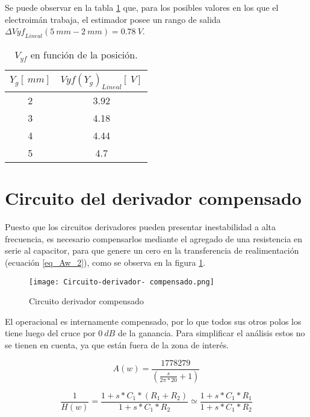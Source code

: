 \noindent Se puede observar en la tabla \ref{tab_Vyf_vs_y} que, para los posibles valores en los que el electroim\'{a}n trabaja, el estimador posee un rango de salida ${\mathit{\Delta}{Vyf}_{Lineal}}(5\:mm-2\:mm)= 0.78\:V$.

\begin{table}[H]
	\begin{center}
		\begin{tabular}{| c | c |}
			\hline
			$Y_g[\:mm]$ & ${Vyf(Y_g)}_{Lineal} [\:V]$\\ \hline
			2 & 3.92 \\ \hline 
			3 & 4.18 \\ \hline 
			4 & 4.44 \\ \hline 
			5 & 4.7 \\ \hline 
		\end{tabular}
		\caption{$V_{yf}$ en función de la posición.}
		\label{tab_Vyf_vs_y}
	\end{center}
\end{table}

\section{Circuito del derivador compensado}

\noindent Puesto que los circuitos derivadores pueden presentar inestabilidad a alta frecuencia, es necesario compensarlos mediante el agregado de una resistencia en serie al capacitor, para que genere un cero en la transferencia de realimentaci\'{o}n (ecuación \ref{eq_Aw_2}), como se observa en la figura  \ref{fig:img_Circuito_derivador_compensado}.

\begin{figure}[H]
	\centering
	\texttt{[image: Circuito-derivador- compensado.png]}
	\caption{Circuito derivador compensado}
	\label{fig:img_Circuito_derivador_compensado}
\end{figure}

\noindent El operacional es internamente compensado, por lo que todos sus otros polos los tiene luego del cruce por $0\:dB$ de la ganancia. Para simplificar el an\'{a}lisis estos no se tienen en cuenta, ya que est\'{a}n fuera de la zona de inter\'{e}s.

\begin{equation} \label{eq_Aw_1}
	A(w)=\frac{1778279}{(\frac{s}{2\pi *20}+1)}
\end{equation} 

\begin{equation} \label{eq_Aw_2}
	\frac{1}{H(w)}=\frac{1+s*C_1*(R_1+R_2)}{1+s*C_1*R_2}\simeq \frac{1+s*C_1*R_1}{1+s*C_1*R_2}
\end{equation}

